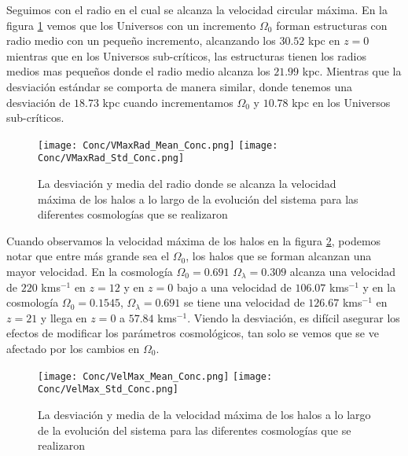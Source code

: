 {\morado Seguimos con el radio en el cual se alcanza la velocidad circular máxima. En la figura} \ref{fig:Conc_VMaxRad} vemos que los Universos con un incremento $\Omega_0$ forman estructuras con radio medio con un pequeño incremento, alcanzando los $30.52$ kpc en $z=0$ mientras que en los Universos sub-críticos, las estructuras tienen los radios medios mas pequeños donde el radio medio alcanza los $21.99$ kpc. Mientras que la desviación estándar se comporta de manera similar, donde tenemos una desviación de $18.73$ kpc cuando incrementamos $\Omega_0$ y $10.78$ kpc en los Universos sub-críticos.

\begin{figure}[H]
      \centering
      \texttt{[image: Conc/VMaxRad\_Mean\_Conc.png]}
      \texttt{[image: Conc/VMaxRad\_Std\_Conc.png]}
      \caption[Evolución de la desviación y media del radio donde se alcanza la velocidad circular máxima de los halos para todas las cosmologías]{La desviación y media del radio donde se alcanza la velocidad máxima de los halos a lo largo de la evolución del sistema para las diferentes cosmologías que se realizaron}
      \label{fig:Conc_VMaxRad}
\end{figure}

Cuando observamos la velocidad máxima de los halos en la figura \ref{fig:Conc_VelMax}, podemos notar que entre más grande sea el $\Omega_0$, los halos que se forman alcanzan una mayor velocidad. En la cosmología $\Omega_0 = 0.691$ $\Omega_\lambda = 0.309$ alcanza una velocidad de $220$ kms$^{-1}$ en $z=12$ y en $z=0$ bajo a una velocidad de $106.07$ kms$^{-1}$ y en la cosmología  $\Omega_0 = 0.1545$, $\Omega_\lambda = 0.691$ se tiene una velocidad de $126.67$ kms$^{-1}$ en $z=21$ y llega en $z=0$ a $57.84$ kms$^{-1}$. Viendo la desviación, es difícil asegurar los efectos de modificar los parámetros cosmológicos, tan solo se vemos que se ve afectado por los cambios en $\Omega_0$.

\begin{figure}[H]
      \centering
      \texttt{[image: Conc/VelMax\_Mean\_Conc.png]}
      \texttt{[image: Conc/VelMax\_Std\_Conc.png]}
      \caption[Evolución de la desviación y media de la velocidad máxima de los halos para todas las cosmologías]{La desviación y media de la velocidad máxima de los halos a lo largo de la evolución del sistema para las diferentes cosmologías que se realizaron}
      \label{fig:Conc_VelMax}
\end{figure}

